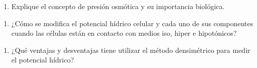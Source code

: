 \documentclass[
  spanish,
  10pt,
  letterpaper,
  twocolumn]{article}
\providecommand{\tightlist}{%
  \setlength{\itemsep}{0pt}\setlength{\parskip}{0pt}}
\begin{document}
\begin{enumerate}
\def\labelenumi{\arabic{enumi}.}
\tightlist
\item
  Explique el concepto de presión osmótica y su importancia biológica.
\end{enumerate}

\hrulefill

\hrulefill

\hrulefill

\hrulefill

\hrulefill

\hrulefill

\hrulefill

\hrulefill

\hrulefill

\hrulefill

\begin{enumerate}
\def\labelenumi{\arabic{enumi}.}
\setcounter{enumi}{1}
\tightlist
\item
  ¿Cómo se modifica el potencial hídrico celular y cada uno de sus
  componentes cuando las células están en contacto con medios iso, hiper
  e hipotónicos?
\end{enumerate}

\hrulefill

\hrulefill

\hrulefill

\hrulefill

\hrulefill

\hrulefill

\hrulefill

\hrulefill

\hrulefill

\hrulefill

\begin{enumerate}
\def\labelenumi{\arabic{enumi}.}
\setcounter{enumi}{2}
\tightlist
\item
  ¿Qué ventajas y desventajas tiene utilizar el método densimétrico para
  medir el potencial hídrico?
\end{enumerate}

\hrulefill

\hrulefill

\hrulefill

\hrulefill

\hrulefill

\hrulefill

\hrulefill

\hrulefill

\hrulefill
\end{document}
